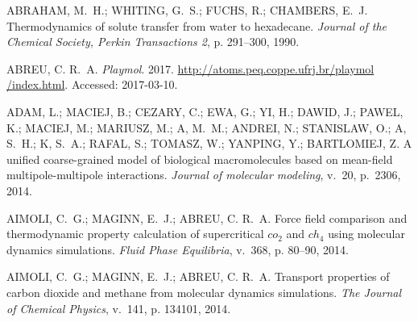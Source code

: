\documentclass[
	12pt,				%
	openany,			%
	oneside,			%
	a4paper,			%
	english,			%
	brazil				%
	]{abntex2}
\begin{document}
 


\postextual

\providecommand{\abntreprintinfo}[1]{%
 \citeonline{#1}}
\setlength{\labelsep}{0pt}\begin{thebibliography}{}
\providecommand{\abntrefinfo}[3]{}
\providecommand{\abntbstabout}[1]{}
\abntbstabout{v-1.9.6 }

\abntrefinfo{Abraham \textit{et al.}}{ABRAHAM \textit{et al.}}{1990}
{ABRAHAM, M.~H.; WHITING, G.~S.; FUCHS, R.; CHAMBERS, E.~J. Thermodynamics of
  solute transfer from water to hexadecane.
\emph{Journal of the Chemical Society, Perkin Transactions 2}, p. 291--300,
  1990.}

\abntrefinfo{ABREU}{ABREU}{2017}
{ABREU, C. R.~A. \emph{Playmol}. 2017.
  \url{http://atoms.peq.coppe.ufrj.br/playmol /index.html}.
Accessed: 2017-03-10.}

\abntrefinfo{Adam \textit{et al.}}{ADAM \textit{et al.}}{2014}
{ADAM, L.; MACIEJ, B.; CEZARY, C.; EWA, G.; YI, H.; DAWID, J.; PAWEL, K.;
  MACIEJ, M.; MARIUSZ, M.; A, M.~M.; ANDREI, N.; STANISLAW, O.; A, S.~H.; K,
  S.~A.; RAFAL, S.; TOMASZ, W.; YANPING, Y.; BARTLOMIEJ, Z. A unified
  coarse-grained model of biological macromolecules based on mean-field
  multipole-multipole interactions.
\emph{Journal of molecular modeling}, v.~20, p.~2306, 2014.}

\abntrefinfo{Aimoli \textit{et al.}}{AIMOLI \textit{et al.}}{2014a}
{AIMOLI, C.~G.; MAGINN, E.~J.; ABREU, C. R.~A. Force field comparison and
  thermodynamic property calculation of supercritical $co_{2}$ and $ch_{4}$
  using molecular dynamics simulations.
\emph{{F}luid {P}hase {E}quilibria}, v.~368, p. 80--90, 2014.}

\abntrefinfo{Aimoli \textit{et al.}}{AIMOLI \textit{et al.}}{2014b}
{AIMOLI, C.~G.; MAGINN, E.~J.; ABREU, C. R.~A. Transport properties of carbon
  dioxide and methane from molecular dynamics simulations.
\emph{The Journal of Chemical Physics}, v.~141, p. 134101, 2014.}


\end{thebibliography}
\end{document}
